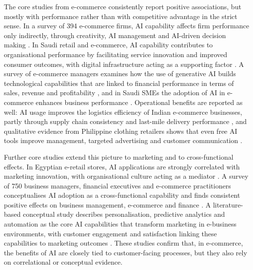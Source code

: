 The core studies from e-commerce consistently report positive associations, but mostly with performance rather than with competitive advantage in the strict sense. In a survey of 394 e-commerce firms, AI capability affects firm performance only indirectly, through creativity, AI management and AI-driven decision making \parencite[1]{chen2022}. In Saudi retail and e-commerce, AI capability contributes to organisational performance by facilitating service innovation and improved consumer outcomes, with digital infrastructure acting as a supporting factor \parencite[1]{slrR111}. A survey of e-commerce managers examines how the use of generative AI builds technological capabilities that are linked to financial performance in terms of sales, revenue and profitability \parencite[93]{slrR219}, and in Saudi SMEs the adoption of AI in e-commerce enhances business performance \parencite[1]{aljarboa2024}. Operational benefits are reported as well: AI usage improves the logistics efficiency of Indian e-commerce businesses, partly through supply chain consistency and last-mile delivery performance \parencite[290]{slrR241}, and qualitative evidence from Philippine clothing retailers shows that even free AI tools improve management, targeted advertising and customer communication \parencite[76]{slrR193}.

Further core studies extend this picture to marketing and to cross-functional effects. In Egyptian e-retail stores, AI applications are strongly correlated with marketing innovation, with organisational culture acting as a mediator \parencite[170]{slrR242}. A survey of 750 business managers, financial executives and e-commerce practitioners conceptualises AI adoption as a cross-functional capability and finds consistent positive effects on business management, e-commerce and finance \parencite[1]{slrR184}. A literature-based conceptual study describes personalisation, predictive analytics and automation as the core AI capabilities that transform marketing in e-business environments, with customer engagement and satisfaction linking these capabilities to marketing outcomes \parencite[1]{slrR155}. These studies confirm that, in e-commerce, the benefits of AI are closely tied to customer-facing processes, but they also rely on correlational or conceptual evidence.

